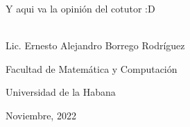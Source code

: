 \begin{co_opinion}
    Y aqui va la opinión del cotutor :D

    \vspace{1cm}


    \begin{flushright}
        \underline{\hspace{6.5cm}}\\
        Lic. Ernesto Alejandro Borrego Rodríguez

        Facultad de Matemática y Computación

        Universidad de la Habana

        Noviembre, 2022
    \end{flushright}

\end{co_opinion}